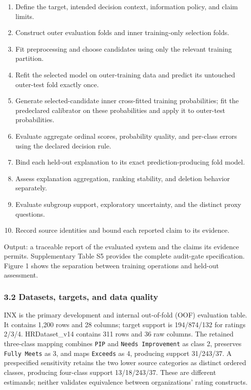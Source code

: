 \documentclass[
  a4paper,
  review]{elsarticle}
\providecommand{\tightlist}{%
  \setlength{\itemsep}{0pt}\setlength{\parskip}{0pt}}
\begin{document}
\begin{enumerate}
\def\labelenumi{\arabic{enumi}.}
\tightlist
\item
  Define the target, intended decision context, information policy, and
  claim limits.
\item
  Construct outer evaluation folds and inner training-only selection
  folds.
\item
  Fit preprocessing and choose candidates using only the relevant
  training partition.
\item
  Refit the selected model on outer-training data and predict its
  untouched outer-test fold exactly once.
\item
  Generate selected-candidate inner cross-fitted training probabilities;
  fit the predeclared calibrator on these probabilities and apply it to
  outer-test probabilities.
\item
  Evaluate aggregate ordinal scores, probability quality, and per-class
  errors using the declared decision rule.
\item
  Bind each held-out explanation to its exact prediction-producing fold
  model.
\item
  Assess explanation aggregation, ranking stability, and deletion
  behavior separately.
\item
  Evaluate subgroup support, exploratory uncertainty, and the distinct
  proxy questions.
\item
  Record source identities and bound each reported claim to its
  evidence.
\end{enumerate}

Output: a traceable report of the evaluated system and the claims its
evidence permits. Supplementary Table S5 provides the complete
audit-gate specification. Figure 1 shows the separation between training
operations and held-out assessment.

\subsubsection{3.2 Datasets, targets, and data
quality}\label{datasets-targets-and-data-quality}

INX is the primary development and internal out-of-fold (OOF) evaluation
table. It contains 1,200 rows and 28 columns; target support is
194/874/132 for ratings 2/3/4. HRDataset\_v14 contains 311 rows and 36
raw columns. The retained three-class mapping combines \texttt{PIP} and
\texttt{Needs\ Improvement} as class 2, preserves \texttt{Fully\ Meets}
as 3, and maps \texttt{Exceeds} as 4, producing support 31/243/37. A
prespecified sensitivity retains the two lower source categories as
distinct ordered classes, producing four-class support 13/18/243/37.
These are different estimands; neither validates equivalence between
organizations' rating constructs.
\end{document}
